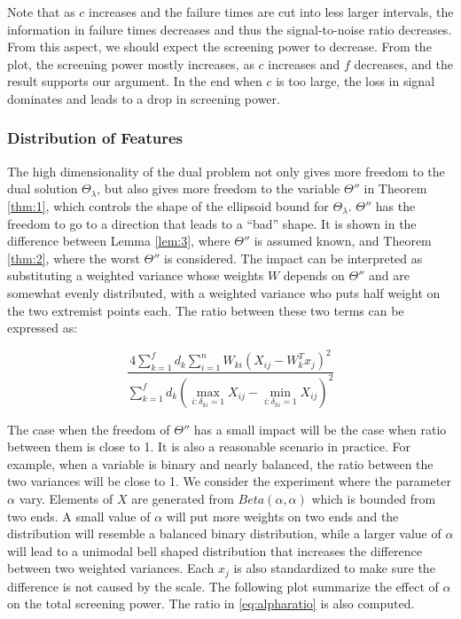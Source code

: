 Note that as $c$ increases and the failure times are cut into less larger intervals, the information in failure times decreases and thus the signal-to-noise ratio decreases. From this aspect, we should expect the screening power to decrease. From the plot, the screening power mostly increases, as $c$ increases and $f$ decreases, and the result supports our argument. In the end when $c$ is too large, the loss in signal dominates and leads to a drop in screening power.

\subsubsection{Distribution of Features}

The high dimensionality of the dual problem not only gives more freedom to the dual solution $\Theta_\lambda$, but also gives more freedom to the variable $\Theta''$ in Theorem \ref{thm:1}, which controls the shape of the ellipsoid bound for $\Theta_\lambda$. $\Theta''$ has the freedom to go to a direction that leads to a ``bad'' shape. It is shown in the difference between Lemma \ref{lem:3}, where $\Theta''$ is assumed known, and Theorem \ref{thm:2}, where the worst $\Theta''$ is considered. The impact can be interpreted as substituting a weighted variance whose weights $W$ depends on $\Theta''$ and are somewhat evenly distributed, with a weighted variance who puts half weight on the two extremist points each. The ratio between these two terms can be expressed as:

\begin{equation}
    \label{eq:alpharatio}
    \frac{4\sum_{k=1}^fd_k\sum_{i=1}^nW_{ki}\left(X_{ij}-W_k^Tx_j\right)^2}{\sum_{k=1}^fd_k\left(\max_{i:\delta_{ki}=1}X_{ij}-\min_{i:\delta_{ki}=1}X_{ij}\right)^2}
\end{equation}

The case when the freedom of $\Theta''$ has a small impact will be the case when ratio between them is close to 1. It is also a reasonable scenario in practice. For example, when a variable is binary and nearly balanced, the ratio between the two variances will be close to 1. We consider the experiment where the parameter $\alpha$ vary. Elements of $X$ are generated from $Beta(\alpha,\alpha)$ which is bounded from two ends. A small value of $\alpha$ will put more weights on two ends and the distribution will resemble a balanced binary distribution, while a larger value of $\alpha$ will lead to a unimodal bell shaped distribution that increases the difference between two weighted variances. Each $x_j$ is also standardized to make sure the difference is not caused by the scale. The following plot summarize the effect of $\alpha$ on the total screening power. The ratio in \eqref{eq:alpharatio} is also computed.

